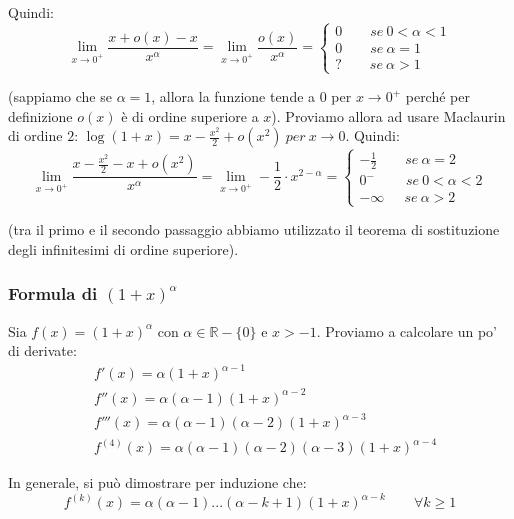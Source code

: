 \documentclass{article}
\begin{document}
\noindent Quindi:
\begin{equation*}
    \lim_{x \to 0^+} \frac{x + o(x) - x}{x^\alpha} = \lim_{x \to 0^+} \frac{o(x)}{x^\alpha} = \begin{cases}
        0 \qquad se \ 0 < \alpha < 1 \\
        0 \qquad se \ \alpha = 1 \\
        ? \qquad se \ \alpha > 1
    \end{cases}
\end{equation*}

\noindent (sappiamo che se $\alpha = 1$, allora la funzione tende a $0$ per $x \to 0^+$ perché per definizione $o(x)$ è di ordine superiore a $x$). Proviamo allora ad usare Maclaurin di ordine $2$: $\log(1 + x) = x - \frac{x^2}{2} + o(x^2) \ per \ x \to 0$. Quindi:
\begin{equation*}
    \lim_{x \to 0^+} \frac{x - \frac{x^2}{2} - x + o(x^2)}{x^\alpha}  = \lim_{x \to 0^+} -\frac{1}{2} \cdot x^{2 - \alpha} = \begin{cases}
        - \frac{1}{2} \qquad se \ \alpha = 2 \\ 
        0^- \qquad \ se \ 0 < \alpha < 2 \\
        - \infty \quad \ \ se \ \alpha > 2
    \end{cases}
\end{equation*}

\noindent (tra il primo e il secondo passaggio abbiamo utilizzato il teorema di sostituzione degli infinitesimi di ordine superiore).

\subsubsection{Formula di $(1 + x)^\alpha$}
Sia $f(x) = (1 + x)^\alpha$ con $\alpha \in \mathbb{R} - \{0\}$ e $x > -1$. Proviamo a calcolare un po' di derivate:
\begin{align*}
    & f'(x) = \alpha(1 + x)^{\alpha - 1} \\
    & f''(x) = \alpha(\alpha - 1)(1 + x)^{\alpha - 2} \\
    & f'''(x) = \alpha(\alpha - 1)(\alpha - 2)(1 + x)^{\alpha - 3} \\
    & f^{(4)}(x) = \alpha(\alpha - 1)(\alpha - 2)(\alpha - 3)(1 + x)^{\alpha - 4}
\end{align*}

\noindent In generale, si può dimostrare per induzione che:
\begin{equation*}
    f^{(k)}(x) = \alpha(\alpha - 1)...(\alpha - k + 1)(1 + x)^{\alpha - k} \qquad \forall k \geq 1
\end{equation*}
\end{document}
